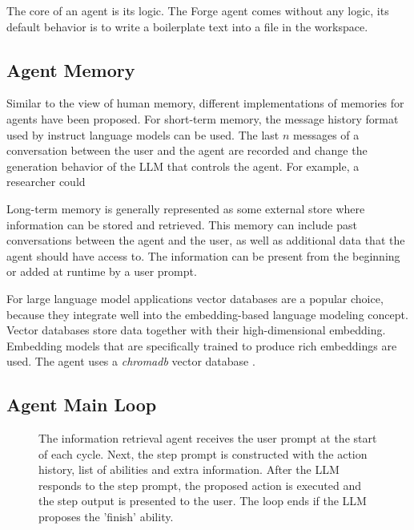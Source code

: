 \documentclass[../main.tex]{subfiles}
\begin{document}
The core of an agent is its logic.
The Forge agent comes without any logic, its default behavior is to write a boilerplate text into a file in the workspace.


\subsection{Agent Memory}

Similar to the view of human memory,
different implementations of memories for agents have been proposed.
For short-term memory,
the message history format used by instruct language models can be used.
The last $n$ messages of a conversation between the user and the agent
are recorded and change the generation behavior of the LLM that controls the agent.
For example, a researcher could

Long-term memory is generally represented as some external store
where information can be stored and retrieved.
This memory can include past conversations between the agent and the user,
as well as additional data that the agent should have access to.
The information can be present from the beginning or added at runtime by a user prompt.

For large language model applications vector databases are a popular choice,
because they integrate well into the embedding-based language modeling concept.
Vector databases store data together with their high-dimensional embedding.
Embedding models that are specifically trained to produce rich embeddings are used.
The agent uses a \emph{chromadb} vector database \autocite{zotero-176}.


\subsection{Agent Main Loop}

\begin{figure}[t]
    \centering
    \caption{The information retrieval agent receives the user prompt at the start of each cycle.
        Next, the step prompt is constructed with the action history, list of abilities and extra information.
        After the LLM responds to the step prompt, the proposed action is executed
        and the step output is presented to the user.
        The loop ends if the LLM proposes the 'finish' ability.}
    \label{fig:agent_loop}
\end{figure}
\end{document}

